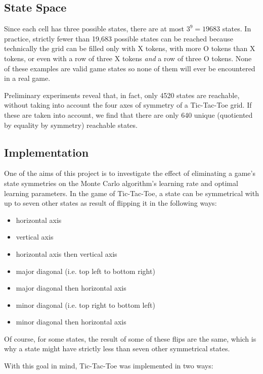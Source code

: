 \documentclass[11pt,a4paper]{report}
\begin{document}
\subsection{State Space}
\label{sec:TicTacToeStateSpace}

Since each cell has three possible states, there are at most $3^9 = 19683$ states. In practice, strictly fewer than 19,683 possible states can be reached because technically the grid can be filled only with X tokens, with more O tokens than X tokens, or even with a row of three X tokens \emph{and} a row of three O tokens. None of these examples are valid game states so none of them will ever be encountered in a real game.

Preliminary experiments reveal that, in fact, only 4520 states are reachable, without taking into account the four axes of symmetry of a Tic-Tac-Toe grid. If these are taken into account, we find that there are only 640 unique (quotiented by equality by symmetry) reachable states.


\subsection{Implementation}
\label{sec:TicTacToeImplementation}

One of the aims of this project is to investigate the effect of eliminating a game's state symmetries on the Monte Carlo algorithm's learning rate and optimal learning parameters. In the game of Tic-Tac-Toe, a state can be symmetrical with up to seven other states as result of flipping it in the following ways:

\begin{itemize}
	\item horizontal axis
	\item vertical axis
	\item horizontal axis then vertical axis
	\item major diagonal (i.e. top left to bottom right)
	\item major diagonal then horizontal axis
	\item minor diagonal (i.e. top right to bottom left)
	\item minor diagonal then horizontal axis
\end{itemize}

Of course, for some states, the result of some of these flips are the same, which is why a state might have strictly less than seven other symmetrical states.

With this goal in mind, Tic-Tac-Toe was implemented in two ways:
\end{document}
